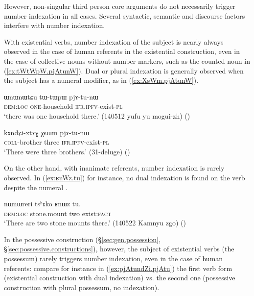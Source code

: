 However, non-singular third person core arguments do not necessarily trigger number indexation in all cases. Several syntactic, semantic and discourse factors interfere with number indexation.

With existential verbs, number indexation of the subject is nearly always observed in the case of human referents in the existential construction, even in the case of collective nouns without number markers, such as the counted noun  in (\ref{ex:tWtWpW.pjAtunW}). Dual or plural indexation is generally observed when the subject has a numeral modifier, as in (\ref{ex:XsWm.pjAtunW}). 


\begin{exe}
\ex \label{ex:tWtWpW.pjAtunW}
\gll  ɯnɯnɯtɕu tɯ-tɯpɯ pjɤ-tu-nɯ \\
\textsc{dem}:\textsc{loc} \textsc{one}-household \textsc{ifr}.\textsc{ipfv}-exist-\textsc{pl} \\
\glt `there was one household there.' (140512 yufu yu mogui-zh) ()
\end{exe}

\begin{exe}
\ex \label{ex:XsWm.pjAtunW}
\gll kɤndʑi-xtɤɣ χsɯm pjɤ-tu-nɯ \\
\textsc{coll}-brother three \textsc{ifr}.\textsc{ipfv}-exist-\textsc{pl} \\
\glt `There were three brothers.' (31-deluge) 	()
\end{exe}

On the other hand, with inanimate referents, number indexation is rarely observed. In (\ref{ex:ʁnWz.tu}) for instance, no dual indexation is found on the verb despite the numeral .

\begin{exe}
\ex \label{ex:ʁnWz.tu}
\gll  nɯnɯreri tsʰɤko ʁnɯz tu. \\
\textsc{dem}:\textsc{loc} stone.mount two exist:\textsc{fact} \\
\glt `There are two stone mounts there.' (140522 Kamnyu zgo) ()
\end{exe}

In the possessive construction (§\ref{sec:gen.possession}, §\ref{sec:possessive.constructions}), however, the subject of existential verbs (the possessum) rarely triggers number indexation, even in the case of human referents: compare for instance in (\ref{ex:pjAtundZi.pjAtu}) the first verb form  (existential construction with dual indexation) vs. the second one  (possessive construction with plural possessum, no indexation).

